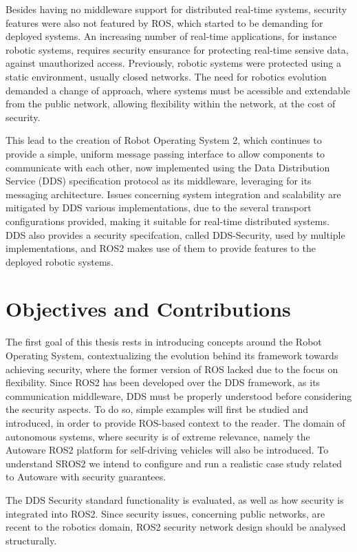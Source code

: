 Besides having no middleware support for distributed real-time systems, security features were also not featured by ROS, which started to be demanding for deployed systems. An increasing number of real-time applications, for instance robotic systems, requires security ensurance for protecting real-time sensive data, against unauthorized access.\cite{lin2009static} 
Previously, robotic systems were protected using a static environment, usually closed networks. The need for robotics evolution demanded a change of approach, where systems must be acessible and extendable from the public network, allowing flexibility within the network, at the cost of security.

This lead to the creation of Robot Operating System 2, which continues to provide a simple, uniform message passing interface to allow components to communicate with each other, now implemented using the Data Distribution Service (DDS)\cite{3} specification protocol as its middleware, leveraging for its messaging architecture. Issues concerning system integration and scalability are mitigated by DDS various implementations, due to the several transport configurations provided, making it suitable for real-time distributed systems. DDS also provides a security specifcation, called DDS-Security, used by multiple implementations, and ROS2 makes use of them to provide features to the deployed robotic systems.\cite{8442103}


\section{Objectives and Contributions}

The first goal of this thesis rests in introducing concepts around the Robot Operating System, contextualizing the evolution behind its framework towards achieving security, where the former version of ROS lacked due to the focus on flexibility. Since ROS2 has been developed over the DDS framework, as its communication middleware, DDS must be properly understood before considering the security aspects. To do so, simple examples will first be studied and introduced, in order to provide ROS-based context to the reader. The domain of autonomous systems, where security is of extreme relevance, namely the Autoware\cite{8443742} ROS2 platform for self-driving vehicles will also be introduced. To understand SROS2 we intend to configure and run a realistic case study related to Autoware with security guarantees. 

The DDS Security standard functionality is evaluated, as well as how security is integrated into ROS2. Since security issues, concerning public networks, are recent to the robotics domain, ROS2 security network design should be analysed structurally.

